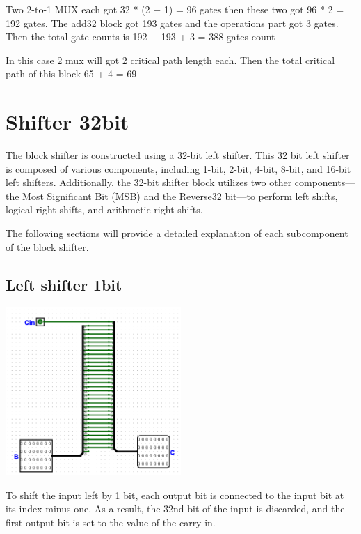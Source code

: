\documentclass{article}
\begin{document}
\hspace{2em}Two 2-to-1 MUX each got 32 * (2 + 1) = 96 gates then these two got 96 * 2 = 192 gates. The add32 block got 193 gates and the operations part got 3 gates. Then the total gate counts is 192 + 193 + 3 = 388 gates count

\hspace{2em}In this case 2 mux will got 2 critical path length each. Then the total critical path of this block 65 + 4 = 69
\section{Shifter 32bit}
\hspace*{2em}The block shifter is constructed using a 32-bit left shifter. This 32 bit left shifter is composed of various components, including 1-bit, 2-bit, 4-bit, 8-bit, and 16-bit left shifters. Additionally, the 32-bit shifter block utilizes two other components—the Most Significant Bit (MSB) and the Reverse32 bit—to perform left shifts, logical right shifts, and arithmetic right shifts.

\hspace*{2em}The following sections will provide a detailed explanation of each subcomponent of the block shifter.
\subsection{Left shifter 1bit}
\begin{center}
    \includegraphics[width=0.5\textwidth]{images/LeftShift1.png}
\end{center}
\hspace*{2em}To shift the input left by 1 bit, each output bit is connected to the input bit at its index minus one. As a result, the 32nd bit of the input is discarded, and the first output bit is set to the value of the carry-in.
\end{document}
